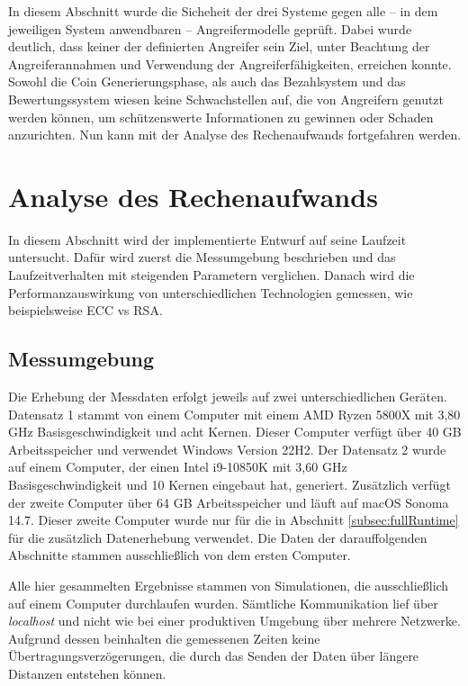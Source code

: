 \documentclass[
	fontsize=11pt,
	headings=small,
	parskip=half,           %
	bibliography=totoc,
	numbers=noenddot,       %
	open=any,               %
]{scrreprt}
\begin{document}
In diesem Abschnitt wurde die Sicheheit der drei Systeme gegen alle -- in dem jeweiligen System anwendbaren -- Angreifermodelle geprüft. Dabei wurde deutlich, dass keiner der definierten Angreifer sein Ziel, unter Beachtung der Angreiferannahmen und Verwendung der Angreiferfähigkeiten, erreichen konnte. Sowohl die Coin Generierungsphase, als auch das Bezahlsystem und das Bewertungssystem wiesen keine Schwachstellen auf, die von Angreifern genutzt werden können, um schützenswerte Informationen zu gewinnen oder Schaden anzurichten. Nun kann mit der Analyse des Rechenaufwands fortgefahren werden.

\section{Analyse des Rechenaufwands}
\label{sec:computationTime}
In diesem Abschnitt wird der implementierte Entwurf auf seine Laufzeit untersucht. Dafür wird zuerst die Messumgebung beschrieben und das Laufzeitverhalten mit steigenden Parametern verglichen. Danach wird die Performanzauswirkung von unterschiedlichen Technologien gemessen, wie beispielsweise ECC vs RSA.

\subsection{Messumgebung}
\label{subsec:timeMessureComputer}
Die Erhebung der Messdaten erfolgt jeweils auf zwei unterschiedlichen Geräten. Datensatz 1 stammt von einem Computer mit einem AMD Ryzen 5800X mit 3,80 GHz Basisgeschwindigkeit und acht Kernen. Dieser Computer verfügt über 40 GB Arbeitsspeicher und verwendet Windows Version 22H2. Der Datensatz 2 wurde auf einem Computer, der einen Intel i9-10850K mit 3,60 GHz Basisgeschwindigkeit und 10 Kernen eingebaut hat, generiert. Zusätzlich verfügt der zweite Computer über 64 GB Arbeitsspeicher und läuft auf macOS Sonoma 14.7. Dieser zweite Computer wurde nur für die in Abschnitt \ref{subsec:fullRuntime} für die zusätzlich Datenerhebung verwendet. Die Daten der darauffolgenden Abschnitte stammen ausschließlich von dem ersten Computer.

Alle hier gesammelten Ergebnisse stammen von Simulationen, die ausschließlich auf einem Computer durchlaufen wurden. Sämtliche Kommunikation lief über \textit{localhost} und nicht wie bei einer produktiven Umgebung über mehrere Netzwerke. Aufgrund dessen beinhalten die gemessenen Zeiten keine Übertragungsverzögerungen, die durch das Senden der Daten über längere Distanzen entstehen können.
\end{document}
